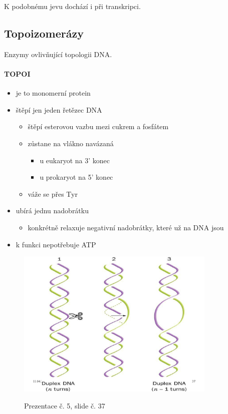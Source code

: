 \documentclass[DIV=8]{scrreprt}
\begin{document}
K podobnému jevu dochází i při transkripci.

\subsection{Topoizomerázy} \label{Topoizomerázy}


Enzymy ovlivňující topologii DNA.

\paragraph{TOPOI}
\begin{itemize}[nosep]
    \item je to monomerní protein
    \item štěpí jen jeden řetězec DNA
\begin{itemize}[nosep]
    \item štěpí esterovou vazbu mezi cukrem a fosfátem
    \item zůstane na vlákno navázaná
\begin{itemize}[nosep]
    \item u eukaryot na 3' konec
    \item u prokaryot na 5' konec
\end{itemize}

    \item váže se přes Tyr
\end{itemize}

    \item ubírá jednu nadobrátku
\begin{itemize}[nosep]
    \item konkrétně relaxuje negativní nadobrátky, které už na DNA jsou
\end{itemize}

    \item k funkci nepotřebuje ATP
\end{itemize}



\begin{figure}
    \caption{Prezentace č. 5, slide č. 37}
    \includegraphics[width=0.85\textwidth]{slides-5/slide-37.jpg}
    \centering
    \label{slides-5-slide-37}
\end{figure}
\end{document}
